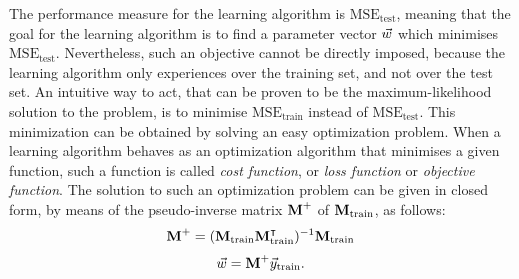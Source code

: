 The performance measure for the learning algorithm is $\mathrm{MSE_{test}}$, meaning that the goal for the learning algorithm is to find a parameter vector $\vec{w}$ which minimises $\mathrm{MSE_{test}}$. Nevertheless, such an objective cannot be directly imposed, because the learning algorithm only experiences over the training set, and not over the test set. An intuitive way to act, that can be proven to be the maximum-likelihood solution to the problem, is to minimise  $\mathrm{MSE_{train}}$ instead of $\mathrm{MSE_{test}}$. This minimization can be obtained by solving an easy optimization problem. When a learning algorithm behaves as an optimization algorithm that minimises a given function, such a function is called \emph{cost function}, or \emph{loss function} or \emph{objective function}. 
The solution to such an optimization problem can be given in closed form, by means of the pseudo-inverse matrix $\textbf{M}^+$ of $\textbf{M}_{\text{train}}$, as follows:
\begin{equation}
\textbf{M}^+ = (\textbf{M}_{\text{train}}\textbf{M}_{\text{train}}^\intercal)^{-1}\textbf{M}_{\text{train}}
\end{equation}
\begin{equation}
\vec{w} = \textbf{M}^+\vec{y}_{\text{train}}.
\end{equation}


